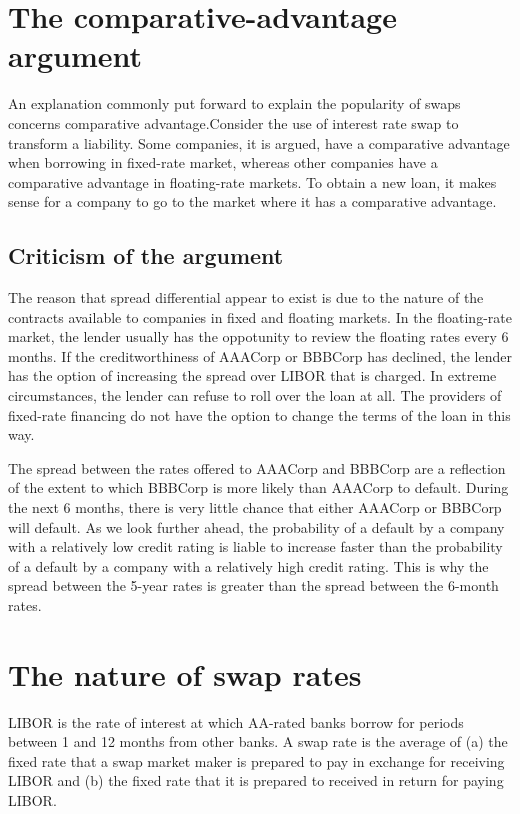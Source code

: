 \documentclass{article}
\begin{document}
\section{The comparative-advantage argument}
An explanation commonly put forward to explain the popularity of swaps concerns comparative advantage.Consider the use of interest rate swap to transform a liability. Some companies, it is argued, have a comparative advantage when borrowing in fixed-rate market, whereas other companies have a comparative advantage in floating-rate markets. To obtain a new loan, it makes sense for a company to go to the market where it has a comparative advantage.

\subsection{Criticism of the argument}
The reason that spread differential appear to exist is due to the nature of the contracts available to companies in fixed and floating markets. In the floating-rate market, the lender usually has the oppotunity to review the floating rates every 6 months. If the creditworthiness of AAACorp or BBBCorp has declined, the lender has the option of increasing the spread over LIBOR that is charged. In extreme circumstances, the lender can refuse to roll over the loan at all. The providers of fixed-rate financing do not have the option to change the terms of the loan in this way.

The spread between the rates offered to AAACorp and BBBCorp are a reflection of the extent to which BBBCorp is more likely than AAACorp to default. During the next 6 months, there is very little chance that either AAACorp or BBBCorp will default. As we look further ahead, the probability of a default by a company with a relatively low credit rating is liable to increase faster than the probability of a default by a company with a relatively high credit rating. This is why the spread between the 5-year rates is greater than the spread between the 6-month rates.

\section{The nature of swap rates}
LIBOR is the rate of interest at which AA-rated banks borrow for periods between 1 and 12 months from other banks. A swap rate is the average of (a) the fixed rate that a swap market maker is prepared to pay in exchange for receiving LIBOR and (b) the fixed rate that it is prepared to received in return for paying LIBOR.
\end{document}
